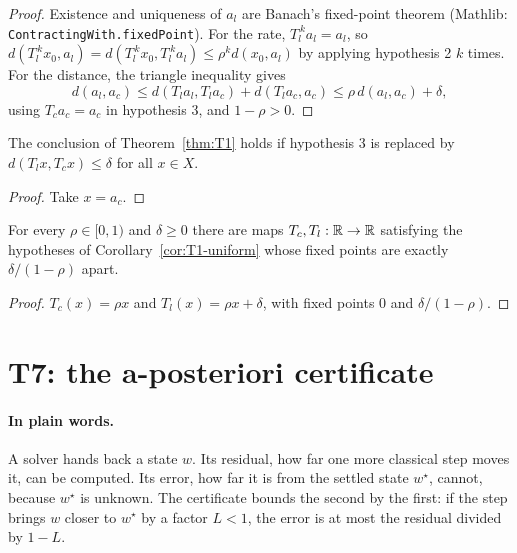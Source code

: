 \begin{proof}
  \leanok
  Existence and uniqueness of $a_l$ are Banach's fixed-point theorem
  (Mathlib: \texttt{ContractingWith.fixedPoint}).  For the rate,
  $T_l^{\,k}a_l=a_l$, so
  $d(T_l^{\,k}x_0,a_l)=d(T_l^{\,k}x_0,T_l^{\,k}a_l)\le\rho^k d(x_0,a_l)$ by
  applying hypothesis 2 $k$ times.  For the distance, the triangle inequality
  gives
  \[
    d(a_l,a_c)\le d(T_la_l,T_la_c)+d(T_la_c,a_c)\le\rho\,d(a_l,a_c)+\delta,
  \]
  using $T_ca_c=a_c$ in hypothesis 3, and $1-\rho>0$.
\end{proof}

\begin{corollary}\label{cor:T1-uniform}
  \leanok
  The conclusion of Theorem~\ref{thm:T1} holds if hypothesis 3 is replaced by
  $d(T_lx,T_cx)\le\delta$ for all $x\in X$.
\end{corollary}

\begin{proof}
  \leanok
  Take $x=a_c$.
\end{proof}

\begin{proposition}[T1 is sharp]\label{prop:T1-sharp}
  \leanok
  For every $\rho\in[0,1)$ and $\delta\ge0$ there are maps $T_c,T_l:\mathbb{R}\to\mathbb{R}$
  satisfying the hypotheses of Corollary~\ref{cor:T1-uniform} whose fixed points
  are exactly $\delta/(1-\rho)$ apart.
\end{proposition}

\begin{proof}
  \leanok
  $T_c(x)=\rho x$ and $T_l(x)=\rho x+\delta$, with fixed points $0$ and
  $\delta/(1-\rho)$.
\end{proof}

\section{T7: the a-posteriori certificate}

\paragraph{In plain words.}
A solver hands back a state $w$.  Its residual, how far one more classical step
moves it, can be computed.  Its error, how far it is from the settled state
$w^\star$, cannot, because $w^\star$ is unknown.  The certificate bounds the
second by the first: if the step brings $w$ closer to $w^\star$ by a factor
$L<1$, the error is at most the residual divided by $1-L$.

